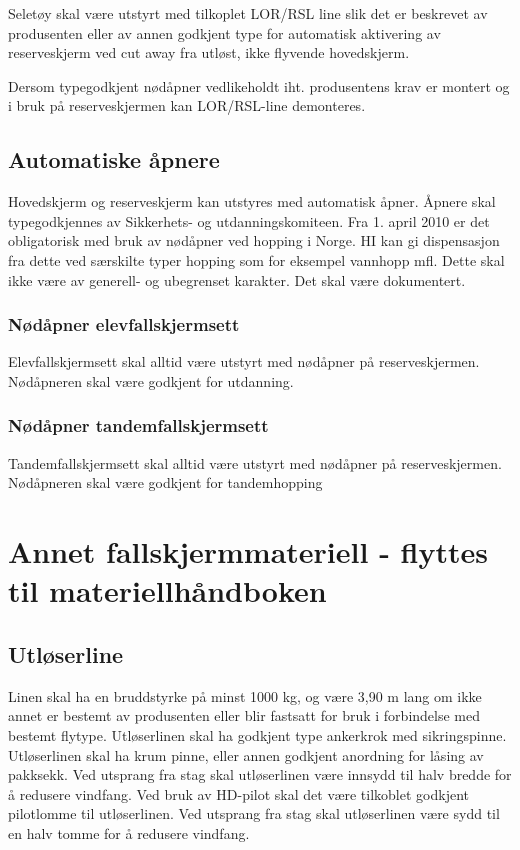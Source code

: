 Seletøy skal være utstyrt med tilkoplet LOR/RSL line slik det er beskrevet av produsenten eller av annen godkjent type for automatisk aktivering av reserveskjerm ved cut away fra utløst, ikke flyvende hovedskjerm.

Dersom typegodkjent nødåpner vedlikeholdt iht. produsentens krav er montert og i bruk på reserveskjermen kan LOR/RSL-line demonteres.

\subsection{Automatiske åpnere}
Hovedskjerm og reserveskjerm kan utstyres med automatisk åpner. Åpnere skal typegodkjennes av Sikkerhets- og utdanningskomiteen. Fra 1. april 2010 er det obligatorisk med bruk av nødåpner ved hopping i Norge. HI kan gi dispensasjon fra dette ved særskilte typer hopping som for eksempel vannhopp mfl. Dette skal ikke være av generell- og ubegrenset karakter. Det skal være dokumentert.

\subsubsection{Nødåpner elevfallskjermsett}
Elevfallskjermsett skal alltid være utstyrt med nødåpner på reserveskjermen. Nødåpneren skal være godkjent for utdanning.

\subsubsection{Nødåpner tandemfallskjermsett}
Tandemfallskjermsett skal alltid være utstyrt med nødåpner på reserveskjermen. Nødåpneren skal være godkjent for tandemhopping

\section[Annet fallskjermmateriell]{Annet fallskjermmateriell - flyttes til materiellhåndboken}
\subsection{Utløserline}
Linen skal ha en bruddstyrke på minst 1000 kg, og være 3,90 m lang om ikke annet er bestemt av produsenten eller blir fastsatt for bruk i forbindelse med bestemt flytype. Utløserlinen skal ha godkjent type ankerkrok med sikringspinne. Utløserlinen skal ha krum pinne, eller annen godkjent anordning for låsing av pakksekk. Ved utsprang fra stag skal utløserlinen være innsydd til halv bredde for å redusere vindfang. Ved bruk av HD-pilot skal det være tilkoblet godkjent pilotlomme til utløserlinen. Ved utsprang fra stag skal utløserlinen være sydd til en halv tomme for å redusere vindfang.

